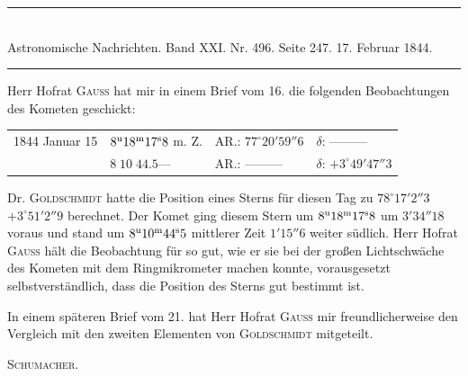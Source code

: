 \clearpage
\hypertarget{native-470-report}{}
\begin{center}
\rule{0.55\linewidth}{0.4pt}\\[2pt]
Astronomische Nachrichten. Band XXI. Nr. 496. Seite 247. 17. Februar 1844.\\[2pt]
\rule{0.55\linewidth}{0.4pt}
\end{center}

Herr Hofrat \textsc{Gauss} hat mir in einem Brief vom 16. die folgenden Beobachtungen des Kometen geschickt:
\begin{center}
\begin{tabular}{l|l|l|l}
1844 Januar 15 & $8^{\rm u}18^{\rm m}17^{\rm s}8$ m. Z. & AR.: $77^\circ20'59''6$ & $\delta$: ---\quad ---\quad --- \\
 & $8\;10\;44.5$\quad --- & AR.: ---\quad ---\quad --- & $\delta$: $+3^\circ49'47''3$ \\
\end{tabular}
\end{center}

Dr. \textsc{Goldschmidt} hatte die Position eines Sterns für diesen Tag zu $78^\circ17'2''3$ $+3^\circ51'2''9$ berechnet. Der Komet ging diesem Stern um $8^{\rm u}18^{\rm m}17^{\rm s}8$ um $3'34''18$ voraus und stand um $8^{\rm u}10^{\rm m}44^{\rm s}5$ mittlerer Zeit $1'15''6$ weiter südlich. Herr Hofrat \textsc{Gauss} hält die Beobachtung für so gut, wie er sie bei der großen Lichtschwäche des Kometen mit dem Ringmikrometer machen konnte, vorausgesetzt selbstverständlich, dass die Position des Sterns gut bestimmt ist.

In einem späteren Brief vom 21. hat Herr Hofrat \textsc{Gauss} mir freundlicherweise den Vergleich mit den zweiten Elementen von \textsc{Goldschmidt} mitgeteilt.
\begin{flushright}\textsc{Schumacher.}\end{flushright}

